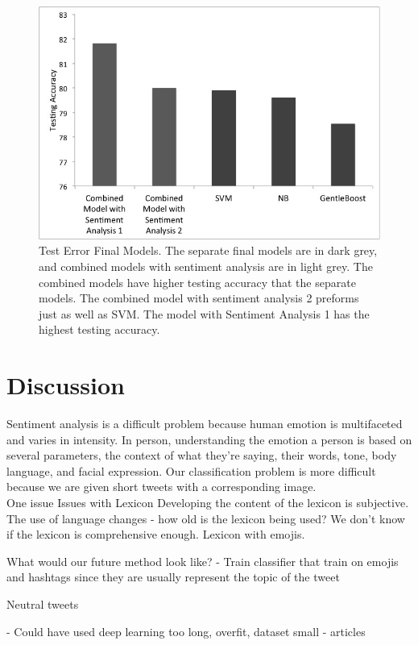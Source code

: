 \documentclass[]{article}
\begin{document}
\begin{figure}
	\centering
  \includegraphics[scale=0.4]{finalgraph.jpg}
  \caption{Test Error Final Models. The separate final models are in dark grey, and combined models with sentiment analysis are in light grey. The combined models have higher testing accuracy that the separate models. The combined model with sentiment analysis 2 preforms just as well as SVM. The model with Sentiment Analysis 1 has the highest testing accuracy.}
  \label{fig:Test Error}
\end{figure}

\section{Discussion}

Sentiment analysis is a difficult problem because human emotion is multifaceted and varies in intensity. In person, understanding the emotion a person is based on several parameters, the context of what they're saying, their words, tone, body language, and facial expression. Our classification problem is more difficult because we are given short tweets with a corresponding image. \\

One issue 
Issues with Lexicon
Developing the content of the lexicon is subjective. The use of language changes - how old is the lexicon being used? We don't know if the lexicon is comprehensive enough. Lexicon with emojis. 

What would our future method look like?
- Train classifier that train on emojis and hashtags since they are usually represent the topic of the tweet


Neutral tweets 


- Could have used deep learning 
	too long, overfit, dataset small
- articles 
\end{document}
